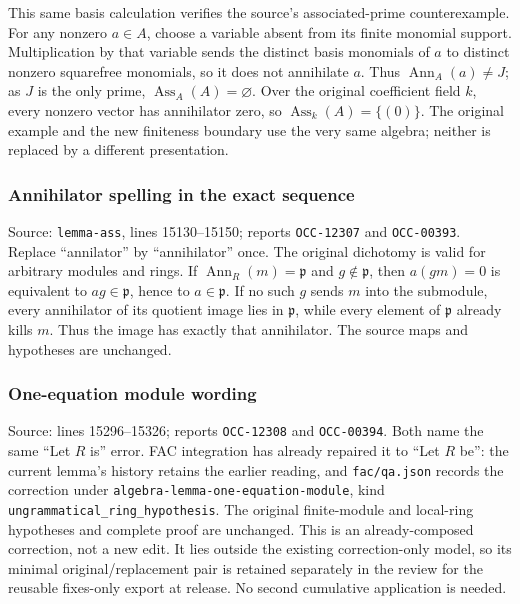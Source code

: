 This same basis calculation verifies the source's associated-prime counterexample. For any nonzero \(a\in A\), choose a variable absent from its finite monomial support. Multiplication by that variable sends the distinct basis monomials of \(a\) to distinct nonzero squarefree monomials, so it does not annihilate \(a\). Thus \(\operatorname{Ann}_A(a)\ne J\); as \(J\) is the only prime, \(\operatorname{Ass}_A(A)=\varnothing\). Over the original coefficient field \(k\), every nonzero vector has annihilator zero, so \(\operatorname{Ass}_k(A)=\{(0)\}\). The original example and the new finiteness boundary use the very same algebra; neither is replaced by a different presentation.

\subsubsection{Annihilator spelling in the exact sequence}\label{algebra-proof-004-annihilator-spelling-in-the-exact-sequence}

Source: \texttt{lemma-ass}, lines 15130--15150; reports \texttt{OCC-12307} and \texttt{OCC-00393}. Replace ``annilator'' by ``annihilator'' once. The original dichotomy is valid for arbitrary modules and rings. If \(\operatorname{Ann}_R(m)=\mathfrak p\) and \(g\notin\mathfrak p\), then \(a(gm)=0\) is equivalent to \(ag\in\mathfrak p\), hence to \(a\in\mathfrak p\). If no such \(g\) sends \(m\) into the submodule, every annihilator of its quotient image lies in \(\mathfrak p\), while every element of \(\mathfrak p\) already kills \(m\). Thus the image has exactly that annihilator. The source maps and hypotheses are unchanged.

\subsubsection{One-equation module wording}\label{algebra-proof-004-one-equation-module-wording}

Source: lines 15296--15326; reports \texttt{OCC-12308} and \texttt{OCC-00394}. Both name the same ``Let \(R\) is'' error. FAC integration has already repaired it to ``Let \(R\) be'': the current lemma's history retains the earlier reading, and \texttt{fac/qa.json} records the correction under \texttt{algebra-lemma-one-equation-module}, kind \texttt{ungrammatical\_ring\_hypothesis}. The original finite-module and local-ring hypotheses and complete proof are unchanged. This is an already-composed correction, not a new edit. It lies outside the existing correction-only model, so its minimal original/replacement pair is retained separately in the review for the reusable fixes-only export at release. No second cumulative application is needed.

